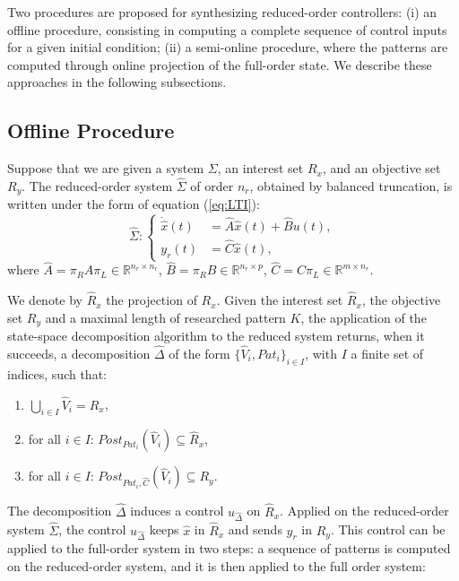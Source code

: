Two procedures are proposed for synthesizing reduced-order controllers:
(i) an offline procedure, consisting in computing a complete sequence of control inputs
for a given initial condition; (ii) a semi-online procedure, where the patterns 
are computed through online projection of the full-order state. 
We describe these approaches in the following subsections.



\subsection{Offline Procedure}
 
 
 
Suppose that we are given a system $\Sigma$, an interest set $R_x$, and an objective
set $R_y$. 
The reduced-order system $\hat \Sigma$ of order $n_r$, obtained by balanced truncation,
is written under the form of equation (\ref{eq:LTI}):
\[
\hat \Sigma : \left\lbrace
\begin{array}{ll}
\dot{ \hat{x}}(t) & =\hat{A} \hat{x}(t)+\hat{B} u(t), \\
 y_r(t) & =\hat{C} \hat{x}(t),
\end{array}
\right.
\]
where $\hat A = \pi_R A \pi_L \in \mathbb{R}^{n_r \times n_r}$,
$\hat B = \pi_R B \in \mathbb{R}^{n_r \times p}$,
$\hat C = C \pi_L \in \mathbb{R}^{m \times n_r}$.


We denote by $\hat R_x$ the projection of $R_x$.
Given the interest set $\hat R_x$, the objective set $R_y$ and a maximal length
of researched pattern $K$, the application of the state-space decomposition algorithm
to the reduced system returns, when it succeeds, a decomposition $\hat \Delta$ 
of the form $\{\hat V_i,Pat_i \}_{i\in I}$, with $I$ a finite set of indices, such that:
\begin{enumerate}
 \item $\bigcup_{i\in I} \hat V_i=\hat{R}_x$,
 \item for all $i \in I$: $Post_{Pat_i}(\hat V_i) \subseteq \hat R_x$,
 \item for all $i \in I$: $Post_{Pat_i,\hat C}( \hat V_i) \subseteq R_y$.
 \end{enumerate}
 
The decomposition $\hat \Delta$ induces a control $u_{\hat \Delta}$ on $\hat R_x$.
Applied on the reduced-order system $\hat \Sigma$, the control $u_{\hat \Delta}$
keeps $\hat x$ in $\hat R_x$ and sends $y_r$ in $R_y$.
This control can be applied to the full-order system in two steps: a sequence of patterns is computed
on the reduced-order system, and it is then applied to the full order system:

